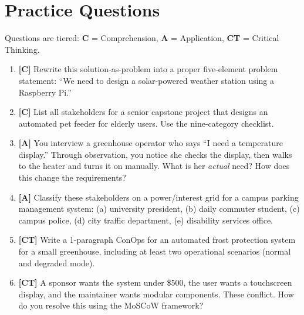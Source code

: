 \documentclass[11pt,letterpaper,twoside,openany]{book}
\begin{document}
\section{Practice Questions}
Questions are tiered: \textbf{C} = Comprehension, \textbf{A} = Application, \textbf{CT} = Critical Thinking.
\begin{enumerate}[leftmargin=1.5em]
\item \textbf{[C]} Rewrite this solution-as-problem into a proper five-element problem statement: ``We need to design a solar-powered weather station using a Raspberry Pi.''
\item \textbf{[C]} List all stakeholders for a senior capstone project that designs an automated pet feeder for elderly users. Use the nine-category checklist.
\item \textbf{[A]} You interview a greenhouse operator who says ``I need a temperature display.'' Through observation, you notice she checks the display, then walks to the heater and turns it on manually. What is her \emph{actual} need? How does this change the requirements?
\item \textbf{[A]} Classify these stakeholders on a power/interest grid for a campus parking management system: (a) university president, (b) daily commuter student, (c) campus police, (d) city traffic department, (e) disability services office.
\item \textbf{[CT]} Write a 1-paragraph ConOps for an automated frost protection system for a small greenhouse, including at least two operational scenarios (normal and degraded mode).
\item \textbf{[CT]} A sponsor wants the system under \$500, the user wants a touchscreen display, and the maintainer wants modular components. These conflict. How do you resolve this using the MoSCoW framework?
\end{enumerate}
\end{document}
